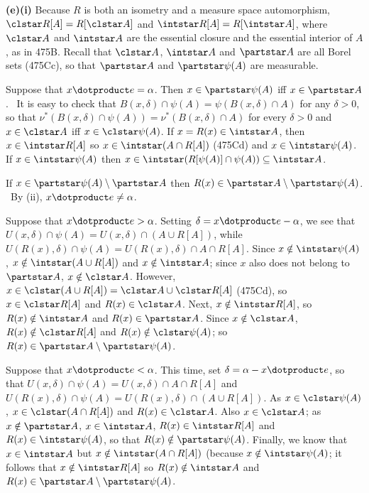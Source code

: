 {{\bf (e)(i)} Because $R$ is both an isometry and a
measure space automorphism, $\clstar R[A]=R[\clstar A]$ and
$\intstar R[A]=R[\intstar A]$, where $\clstar A$ and $\intstar A$ are
the essential closure and the essential interior of $A$, as in 475B.
Recall that $\clstar A$, $\intstar A$ and $\partstar A$ are all Borel
sets (475Cc), so that $\partstar A$ and $\partstar\psi(A)$ are
measurable.

\medskip

 Suppose that $\varinnerprod{x}{e}=\alpha$.   Then
$x\in\partstar\psi(A)$
iff $x\in\partstar A$.   \Prf\ It is easy to check that
$B(x,\delta)\cap\psi(A)=\psi(B(x,\delta)\cap A)$ for any $\delta>0$, so
that $\nu^*(B(x,\delta)\cap\psi(A))=\nu^*(B(x,\delta)\cap A)$ for
every $\delta>0$ and $x\in\clstar A$ iff $x\in\clstar\psi(A)$.   If
$x=R(x)\in\intstar A$, then $x\in\intstar R[A]$ so
$x\in\intstar(A\cap R[A])$ (475Cd) and $x\in\intstar\psi(A)$.   If
$x\in\intstar\psi(A)$ then
$x\in\intstar(R[\psi(A)]\cap\psi(A))\subseteq\intstar A$.\ \Qed

\medskip

 If $x\in\partstar\psi(A)\setminus\partstar A$ then
$R(x)\in\partstar A\setminus\partstar\psi(A)$.   \Prf\ By (ii),
$\varinnerprod{x}{e}\ne\alpha$.

 Suppose that $\varinnerprod{x}{e}>\alpha$.   Setting
$\delta=\varinnerprod{x}{e}-\alpha$, we see that
$U(x,\delta)\cap\psi(A)=U(x,\delta)\cap(A\cup R[A])$, while
$U(R(x),\delta)\cap\psi(A)=U(R(x),\delta)\cap A\cap R[A]$.   Since
$x\notin\intstar\psi(A)$, $x\notin\intstar(A\cup R[A])$ and
$x\notin\intstar A$;  since $x$ also does not belong to $\partstar A$,
$x\notin\clstar A$.   However,
$x\in\clstar(A\cup R[A])=\clstar A\cup\clstar R[A]$ (475Cd), so
$x\in\clstar R[A]$ and $R(x)\in\clstar A$.   Next,
$x\notin\intstar R[A]$, so $R(x)\notin\intstar A$ and
$R(x)\in\partstar A$.   Since $x\notin\clstar A$,
$R(x)\notin\clstar R[A]$ and $R(x)\notin\clstar\psi(A)$;  so
$R(x)\in\partstar A\setminus\partstar\psi(A)$.

 Suppose that $\varinnerprod{x}{e}<\alpha$.    This
time, set $\delta=\alpha-\varinnerprod{x}{e}$, so that
$U(x,\delta)\cap\psi(A)=U(x,\delta)\cap A\cap R[A]$ and
$U(R(x),\delta)\cap\psi(A)=U(R(x),\delta)\cap(A\cup R[A])$.   As
$x\in\clstar\psi(A)$, $x\in\clstar(A\cap R[A])$ and $R(x)\in\clstar A$.
Also $x\in\clstar A$;  as $x\notin\partstar A$, $x\in\intstar A$,
$R(x)\in\intstar R[A]$ and $R(x)\in\intstar\psi(A)$, so that
$R(x)\notin\partstar\psi(A)$.   Finally, we know that $x\in\intstar A$
but $x\notin\intstar(A\cap R[A])$ (because $x\notin\intstar\psi(A)$;  it
follows that $x\notin\intstar R[A]$ so $R(x)\notin\intstar A$ and
$R(x)\in\partstar A\setminus\partstar\psi(A)$.

}
